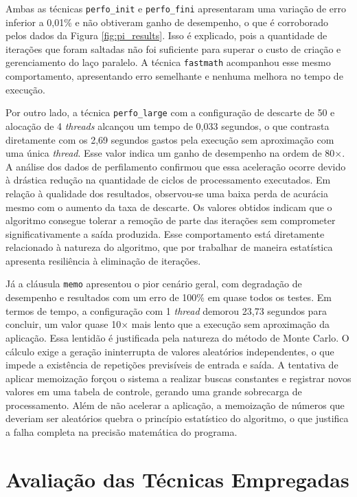 Ambas as técnicas \texttt{perfo\_init} e \texttt{perfo\_fini} apresentaram uma variação de erro inferior a 0,01\% e não obtiveram ganho de desempenho, o que é corroborado pelos dados da Figura \ref{fig:pi_results}. Isso é explicado, pois a quantidade de iterações que foram saltadas não foi suficiente para superar o custo de criação e gerenciamento do laço paralelo. A técnica \texttt{fastmath} acompanhou esse mesmo comportamento, apresentando erro semelhante e nenhuma melhora no tempo de execução.

Por outro lado, a técnica \texttt{perfo\_large} com a configuração de descarte de 50 e alocação de 4 \textit{threads} alcançou um tempo de 0,033 segundos, o que contrasta diretamente com os 2,69 segundos gastos pela execução sem aproximação com uma única \textit{thread}. Esse valor indica um ganho de desempenho na ordem de 80$\times$. A análise dos dados de perfilamento confirmou que essa aceleração ocorre devido à drástica redução na quantidade de ciclos de processamento executados. Em relação à qualidade dos resultados, observou-se uma baixa perda de acurácia mesmo com o aumento da taxa de descarte. Os valores obtidos indicam que o algoritmo consegue tolerar a remoção de parte das iterações sem comprometer significativamente a saída produzida. Esse comportamento está diretamente relacionado à natureza do algoritmo, que por trabalhar de maneira estatística apresenta resiliência à eliminação de iterações.

Já a cláusula \texttt{memo} apresentou o pior cenário geral, com degradação de desempenho e resultados com um erro de 100\% em quase todos os testes. Em termos de tempo, a configuração com 1 \textit{thread} demorou 23,73 segundos para concluir, um valor quase 10$\times$ mais lento que a execução sem aproximação da aplicação. Essa lentidão é justificada pela natureza do método de Monte Carlo. O cálculo exige a geração ininterrupta de valores aleatórios independentes, o que impede a existência de repetições previsíveis de entrada e saída. A tentativa de aplicar memoização forçou o sistema a realizar buscas constantes e registrar novos valores em uma tabela de controle, gerando uma grande sobrecarga de processamento. Além de não acelerar a aplicação, a memoização de números que deveriam ser aleatórios quebra o princípio estatístico do algoritmo, o que justifica a falha completa na precisão matemática do programa.

\section{Avaliação das Técnicas Empregadas}\label{sec:avaliacao}


